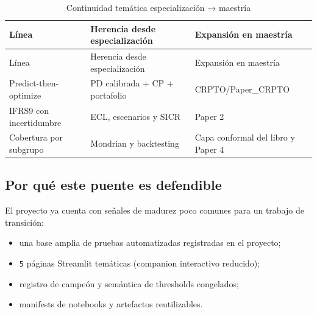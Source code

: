\documentclass[
  spanish,
  11pt,
  letterpaper,
]{scrbook}
\providecommand{\tightlist}{%
  \setlength{\itemsep}{0pt}\setlength{\parskip}{0pt}}
\theoremstyle{plain}
\theoremstyle{remark}
\begin{document}
\begin{longtable}[]{@{}
  >{\raggedright\arraybackslash}p{}
  >{\raggedright\arraybackslash}p{}
  >{\raggedright\arraybackslash}p{}@{}}
\caption{Continuidad temática especialización →
maestría}\label{tbl-bridge-masters}\tabularnewline
\toprule\noalign{}
\begin{minipage}[b]{\linewidth}\raggedright
Línea
\end{minipage} & \begin{minipage}[b]{\linewidth}\raggedright
Herencia desde especialización
\end{minipage} & \begin{minipage}[b]{\linewidth}\raggedright
Expansión en maestría
\end{minipage} \\
\midrule\noalign{}
\endfirsthead
\toprule\noalign{}
\begin{minipage}[b]{\linewidth}\raggedright
Línea
\end{minipage} & \begin{minipage}[b]{\linewidth}\raggedright
Herencia desde especialización
\end{minipage} & \begin{minipage}[b]{\linewidth}\raggedright
Expansión en maestría
\end{minipage} \\
\midrule\noalign{}
\endhead
\bottomrule\noalign{}
\endlastfoot
Predict-then-optimize & PD calibrada + CP + portafolio &
CRPTO/Paper\_CRPTO \\
IFRS9 con incertidumbre & ECL, escenarios y SICR & Paper 2 \\
Cobertura por subgrupo & Mondrian y backtesting & Capa conformal del
libro y Paper 4 \\
\end{longtable}

\subsection{Por qué este puente es
defendible}\label{por-quuxe9-este-puente-es-defendible}

El proyecto ya cuenta con señales de madurez poco comunes para un
trabajo de transición:

\begin{itemize}
\tightlist
\item
  una base amplia de pruebas automatizadas registradas en el proyecto;
\item
  \texttt{5} páginas Streamlit temáticas (companion interactivo
  reducido);
\item
  registro de campeón y semántica de thresholds congelados;
\item
  manifests de notebooks y artefactos reutilizables.
\end{itemize}
\end{document}
